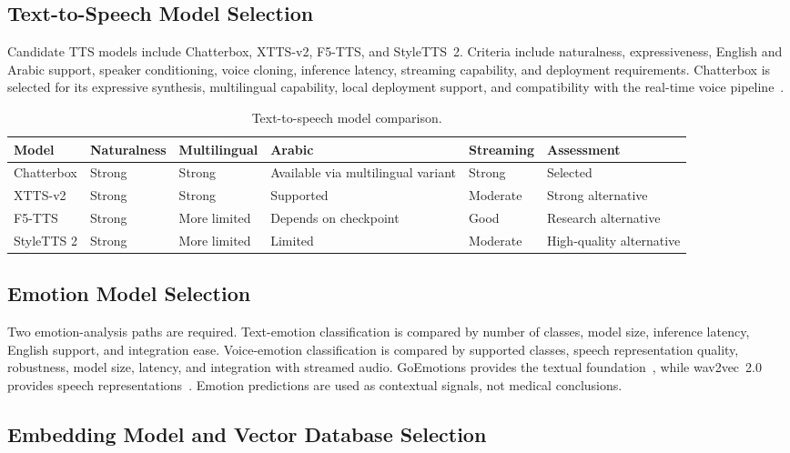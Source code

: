 \documentclass[12pt,a4paper,oneside,openany]{report}
\begin{document}
\subsection{Text-to-Speech Model Selection}

Candidate TTS models include Chatterbox, XTTS-v2, F5-TTS, and StyleTTS~2. Criteria include naturalness, expressiveness, English and Arabic support, speaker conditioning, voice cloning, inference latency, streaming capability, and deployment requirements. Chatterbox is selected for its expressive synthesis, multilingual capability, local deployment support, and compatibility with the real-time voice pipeline~\cite{seo2026chatterbox}.

\begin{table}[H]
\centering\small
\caption{Text-to-speech model comparison.}
\label{tab:tts}
\begin{tabular}{@{}llllll@{}}
\toprule
Model & Naturalness & Multilingual & Arabic & Streaming & Assessment \\
\midrule
Chatterbox & Strong & Strong & Available via multilingual variant & Strong & Selected \\
XTTS-v2 & Strong & Strong & Supported & Moderate & Strong alternative \\
F5-TTS & Strong & More limited & Depends on checkpoint & Good & Research alternative \\
StyleTTS 2 & Strong & More limited & Limited & Moderate & High-quality alternative \\
\bottomrule
\end{tabular}
\end{table}

\subsection{Emotion Model Selection}

Two emotion-analysis paths are required. Text-emotion classification is compared by number of classes, model size, inference latency, English support, and integration ease. Voice-emotion classification is compared by supported classes, speech representation quality, robustness, model size, latency, and integration with streamed audio. GoEmotions provides the textual foundation~\cite{demszky2019goemotions}, while wav2vec~2.0 provides speech representations~\cite{baevski2020wav2vec}. Emotion predictions are used as contextual signals, not medical conclusions.

\subsection{Embedding Model and Vector Database Selection}
\end{document}
